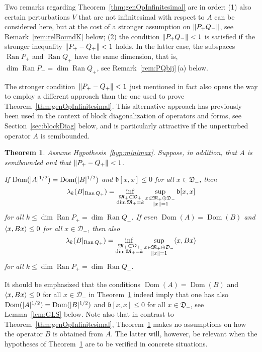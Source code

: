\documentclass[11pt,a4paper]{amsart}
\numberwithin{equation}{section}
\DeclareMathOperator{\Ran}{Ran}
\DeclareMathOperator{\Dom}{Dom}
\DeclarePairedDelimiter{\abs}{|}{|}
\DeclarePairedDelimiter{\norm}{\lVert}{\rVert}
\DeclarePairedDelimiter{\scprod}{\langle}{\rangle}
\newcommand{\cD}{{\mathcal D}}
\newcommand{\fb}{{\mathfrak b}}
\newcommand{\fD}{{\mathfrak D}}
\newcommand{\fM}{{\mathfrak M}}
\theoremstyle{plain}
\newtheorem{theorem}{Theorem}[section]
\theoremstyle{definition}
\theoremstyle{remark}
\begin{document}
Two remarks regarding Theorem~\ref{thm:genOpInfinitesimal} are in order:
(1)
also certain perturbations $V$ that are not infinitesimal with respect to $A$ can be considered here, but at the cost of a
stronger assumption on $\norm{P_+Q_-}$, see Remark~\ref{rem:relBoundK} below;
(2)
the condition $\norm{P_+Q_-} < 1$ is satisfied if the stronger inequality $\norm{P_+-Q_+} < 1$ holds. In the latter case, the
subspaces $\Ran P_+$ and $\Ran Q_+$ have the same dimension, that is, $\dim \Ran P_+ = \dim \Ran Q_+$, see
Remark~\ref{rem:PQbij}\,(a) below.

The stronger condition~$\norm{P_+-Q_+} < 1$ just mentioned in fact also opens the way to employ a different approach than the one
used to prove Theorem~\ref{thm:genOpInfinitesimal}. This alternative approach has previously been used in the context of block
diagonalization of operators and forms, see Section~\ref{sec:blockDiag} below, and is particularly attractive if the unperturbed
operator $A$ is semibounded.

\begin{theorem}\label{thm:genSemibounded}
  Assume Hypothesis~\ref{hyp:minimax}. Suppose, in addition, that $A$ is semibounded and that $\norm{P_+ - Q_+} < 1$.

  If $\Dom(\abs{A}^{1/2}) = \Dom(\abs{B}^{1/2})$ and $\fb[ x , x ] \le 0$ for all $x \in \fD_-$, then
  \begin{equation}\label{eq:genSemibounded:form}
    \lambda_k(B|_{\Ran Q_+})
    =
    \inf_{\substack{\fM_+\subset\fD_+\\ \dim\fM_+=k}} \sup_{\substack{x\in\fM_+ \oplus \fD_-\\ \norm{x}=1}} \fb[x,x]
  \end{equation}
  for all $k \le \dim\Ran P_+ = \dim\Ran Q_+$. If even $\Dom(A) = \Dom(B)$ and $\scprod{ x , Bx } \le 0$ for all $x \in \cD_-$,
  then also
  \begin{equation}\label{eq:genSemibounded:op}
    \lambda_k(B|_{\Ran Q_+})
    =
    \inf_{\substack{\fM_+\subset\cD_+\\ \dim\fM_+=k}} \sup_{\substack{x\in\fM_+ \oplus \cD_-\\ \norm{x}=1}} \scprod{ x , Bx }
  \end{equation}
  for all $k \le \dim\Ran P_+ = \dim\Ran Q_+$.
\end{theorem}

It should be emphasized that the conditions $\Dom(A) = \Dom(B)$ and $\scprod{ x , Bx } \le 0$ for all $x \in \cD_-$ in
Theorem~\ref{thm:genSemibounded} indeed imply that one has also $\Dom(\abs{A}^{1/2}) = \Dom(\abs{B}^{1/2})$ and
$\fb[ x , x ] \le 0$ for all $x \in \fD_-$, see Lemma~\ref{lem:GLS} below. Note also that in contrast to
Theorem~\ref{thm:genOpInfinitesimal}, Theorem~\ref{thm:genSemibounded} makes no assumptions on how the operator $B$ is obtained
from $A$. The latter will, however, be relevant when the hypotheses of Theorem~\ref{thm:genSemibounded} are to be verified in
concrete situations.
\end{document}
